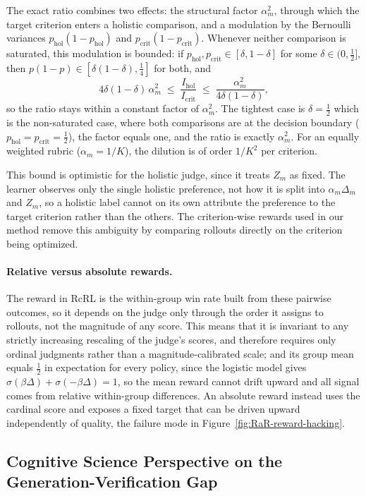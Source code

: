 \documentclass{article}
\theoremstyle{plain}
\theoremstyle{definition}
\theoremstyle{remark}
\begin{document}
The exact ratio combines two effects: the structural factor $\alpha_m^2$, through which
the target criterion enters a holistic comparison, and a modulation by the Bernoulli
variances $p_{\mathrm{hol}}(1-p_{\mathrm{hol}})$ and
$p_{\mathrm{crit}}(1-p_{\mathrm{crit}})$. Whenever neither comparison is saturated, this
modulation is bounded: if $p_{\mathrm{hol}},p_{\mathrm{crit}}\in[\delta,1-\delta]$ for
some $\delta\in(0,\tfrac12]$, then $p(1-p)\in[\delta(1-\delta),\tfrac14]$ for both, and
\[
4\delta(1-\delta)\,\alpha_m^2
\;\le\;
\frac{I_{\mathrm{hol}}}{I_{\mathrm{crit}}}
\;\le\;
\frac{\alpha_m^2}{4\delta(1-\delta)},
\]
so the ratio stays within a constant factor of $\alpha_m^2$. The tightest case is
$\delta=\tfrac12$ which is the non-saturated case, where both comparisons are at the decision boundary
($p_{\mathrm{hol}}=p_{\mathrm{crit}}=\tfrac12$), the factor equals one, and the ratio is
exactly $\alpha_m^2$. For an equally weighted rubric ($\alpha_m=1/K$), the dilution is of
order $1/K^2$ per criterion.

This bound is optimistic for the holistic judge, since it treats $Z_m$ as fixed. The
learner observes only the single holistic preference, not how it is split into
$\alpha_m\Delta_m$ and $Z_m$, so a holistic label cannot on its own attribute the
preference to the target criterion rather than the others. The criterion-wise rewards used in our method remove
this ambiguity by comparing rollouts directly on the criterion being optimized.

\paragraph{Relative versus absolute rewards.}
The reward in RcRL is the within-group win rate built from these pairwise outcomes, so it
depends on the judge only through the order it assigns to rollouts, not the magnitude of any
score. This means that it is invariant to any strictly increasing rescaling of the
judge's scores, and therefore requires only ordinal judgments rather than a magnitude-calibrated
scale; and its group mean equals $\tfrac12$ in expectation for every policy, since the logistic
model gives $\sigma(\beta\Delta)+\sigma(-\beta\Delta)=1$, so the mean reward cannot drift upward
and all signal comes from relative within-group differences. An absolute reward instead uses the cardinal score and exposes a fixed target that can be driven upward independently of quality,
the failure mode in Figure~\ref{fig:RaR-reward-hacking}.

\subsection{Cognitive Science Perspective on the Generation-Verification Gap}
\label{app:cogsci}
\end{document}
